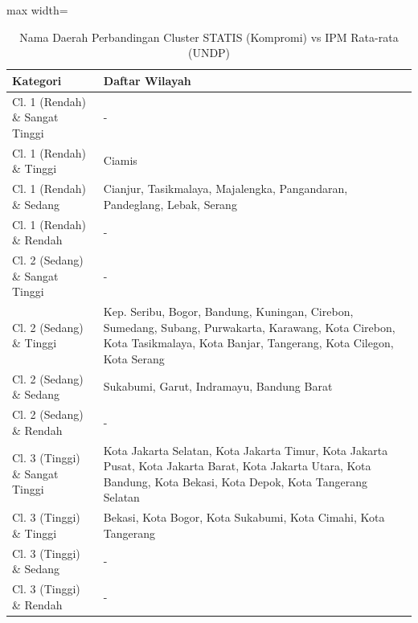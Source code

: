 \begin{table}[H]
\centering
\caption{Nama Daerah Perbandingan Cluster STATIS (Kompromi) vs IPM Rata-rata (UNDP)} \makeatletter{}\makeatother
\begin{adjustbox}{max width=\textwidth}
\begin{tabular}{|p{4cm}|p{10cm}|}
\hline
\textbf{Kategori} & \textbf{Daftar Wilayah} \\
\hline
Cl. 1 (Rendah) \& Sangat Tinggi & - \\
\hline
Cl. 1 (Rendah) \& Tinggi & Ciamis \\
\hline
Cl. 1 (Rendah) \& Sedang & Cianjur, Tasikmalaya, Majalengka, Pangandaran, Pandeglang, Lebak, Serang \\
\hline
Cl. 1 (Rendah) \& Rendah & - \\
\hline
Cl. 2 (Sedang) \& Sangat Tinggi & - \\
\hline
Cl. 2 (Sedang) \& Tinggi & Kep. Seribu, Bogor, Bandung, Kuningan, Cirebon, Sumedang, Subang, Purwakarta, Karawang, Kota Cirebon, Kota Tasikmalaya, Kota Banjar, Tangerang, Kota Cilegon, Kota Serang \\
\hline
Cl. 2 (Sedang) \& Sedang & Sukabumi, Garut, Indramayu, Bandung Barat \\
\hline
Cl. 2 (Sedang) \& Rendah & - \\
\hline
Cl. 3 (Tinggi) \& Sangat Tinggi & Kota Jakarta Selatan, Kota Jakarta Timur, Kota Jakarta Pusat, Kota Jakarta Barat, Kota Jakarta Utara, Kota Bandung, Kota Bekasi, Kota Depok, Kota Tangerang Selatan \\
\hline
Cl. 3 (Tinggi) \& Tinggi & Bekasi, Kota Bogor, Kota Sukabumi, Kota Cimahi, Kota Tangerang \\
\hline
Cl. 3 (Tinggi) \& Sedang & - \\
\hline
Cl. 3 (Tinggi) \& Rendah & - \\
\hline
\end{tabular}
\end{adjustbox}
\end{table}